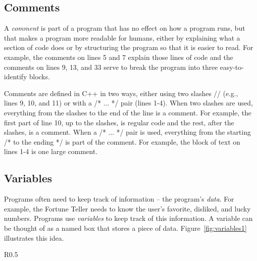 \subsection{Comments}

 A \emph{comment} is part of a program that has no effect on how a program runs, but that makes a program more readable for humans, either by explaining what a section of code does or by structuring the program so that it is easier to read.  For example, the comments on lines 5 and 7 explain those lines of code and the comments on lines 9, 13, and 33 serve to break the program into three easy-to-identify blocks.  

Comments are defined in C++ in two ways, either using two slashes // (e.g., lines 9, 10, and 11) or with a /* ... */ pair (lines 1-4).  When two slashes are used, everything from the slashes to the end of the line is a comment.  For example, the first part of line 10, up to the slashes, is regular code and the rest, after the slashes, is a comment.
When a /* ... */ pair is used, everything from the starting /* to the ending */ is part of the comment.  For example, the block of text on lines 1-4 is one large comment.

\subsection{Variables}

Programs often need to keep track of information -- the program's \emph{data}.  For example, the Fortune Teller needs to know the user's favorite, disliked, and lucky numbers.  Programs use \emph{variables} to keep track of this information.  A variable can be thought of as a named box that stores a piece of data.  Figure~\ref{fig:variables1} illustrates this idea.

\begin{wrapfigure}{R}{0.5\textwidth}\vspace{-0.5cm} 
\vspace{-0.4cm}
\end{wrapfigure}

